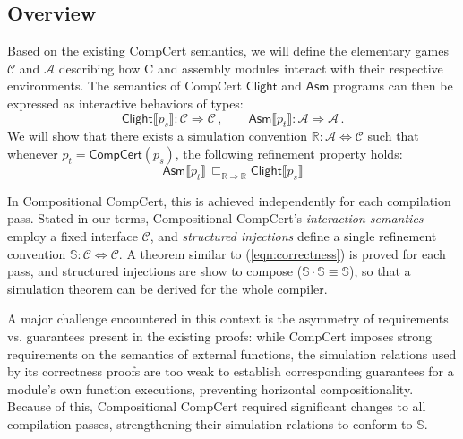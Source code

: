 \documentclass[acmsmall,timestamp,review]{acmart}
\newcommand{\kw}[1]{\ensuremath{ \mathsf{#1} }}
\begin{document}
\subsection{Overview} %

Based on the existing CompCert semantics,
we will define the elementary games
$\mathcal{C}$ and $\mathcal{A}$
describing how C and assembly modules
interact with their respective environments.
The semantics of CompCert $\kw{Clight}$ and $\kw{Asm}$ programs
can then be expressed as interactive behaviors of types:
\[
    \kw{Clight} \llbracket p_s \rrbracket :
      \mathcal{C} \Rightarrow \mathcal{C} \,, \qquad
    \kw{Asm} \llbracket p_t \rrbracket :
      \mathcal{A} \Rightarrow \mathcal{A} \,.
\]
We will show that there exists a simulation convention
$\mathbb{R} : \mathcal{A} \Leftrightarrow \mathcal{C}$
such that whenever $p_t = \kw{CompCert}(p_s)$,
the following refinement property holds:
\begin{equation}
    \label{eqn:correctness}
    \kw{Asm} \llbracket p_t \rrbracket
    \, \sqsubseteq_{\mathbb{R} \Rightarrow \mathbb{R}}
    \kw{Clight} \llbracket p_s \rrbracket
\end{equation}

In Compositional CompCert,
this is achieved independently for each compilation pass.
Stated in our terms,
Compositional CompCert's \emph{interaction semantics}
employ a fixed interface $\mathcal{C}$,
and \emph{structured injections} define a single refinement convention
$\mathbb{S} : \mathcal{C} \Leftrightarrow \mathcal{C}$.
A theorem similar to (\ref{eqn:correctness}) is proved for each pass,
and structured injections are show to compose
($\mathbb{S} \cdot \mathbb{S} \equiv \mathbb{S}$),
so that a simulation theorem can be derived for the whole compiler.

A major challenge encountered in this context
is the asymmetry of requirements vs. guarantees
present in the existing proofs:
while CompCert imposes strong requirements
on the semantics of external functions,
the simulation relations used by its correctness proofs
are too weak to establish corresponding guarantees
for a module's own function executions,
preventing horizontal compositionality.
Because of this,
Compositional CompCert required significant changes
to all compilation passes,
strengthening their simulation relations
to conform to $\mathbb{S}$.
\end{document}
